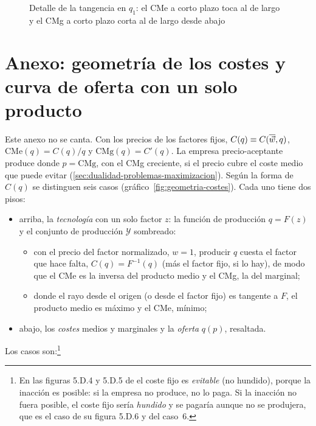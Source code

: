 \documentclass[11pt]{article}
\begin{document}
\begin{figure}[H]
\centering
\caption{Detalle de la tangencia en $q_1$: el CMe a corto plazo toca al de largo y el CMg a corto plazo corta al de largo desde abajo}\label{fig:tangencia-corto-largo}
\end{figure}

\section{Anexo: geometría de los costes\cortetitulo{} y curva de oferta con un solo producto}\label{anexo:geometria}

Este anexo no se canta. Con los precios de los factores fijos, $C(q)\equiv C(\overline{\vec{w}},q)$, $\mathrm{CMe}(q)=C(q)/q$ y $\mathrm{CMg}(q)=C'(q)$. La empresa precio-aceptante produce donde $p=\mathrm{CMg}$, con el CMg creciente, si el precio cubre el coste medio que puede evitar (\ref{sec:dualidad-problemas-maximizacion}). Según la forma de $C(q)$\nocite{MasColellWhinstonGreen1995} se distinguen seis casos (gráfico~\ref{fig:geometria-costes}). Cada uno tiene dos pisos:
\begin{itemize}
\item arriba, la \emph{tecnología} con un solo factor $z$: la función de producción $q=F(z)$ y el conjunto de producción $\mathcal{Y}$ sombreado:
  \begin{itemize}
  \item con el precio del factor normalizado, $w=1$, producir $q$ cuesta el factor que hace falta, $C(q)=F^{-1}(q)$ (más el factor fijo, si lo hay), de modo que el CMe es la inversa del producto medio y el CMg, la del marginal;
  \item donde el rayo desde el origen (o desde el factor fijo) es tangente a $F$, el producto medio es máximo y el CMe, mínimo;
  \end{itemize}
\item abajo, los \emph{costes} medios y marginales y la \emph{oferta} $q(p)$, resaltada.
\end{itemize}
Los casos son:\footnote{En las figuras 5.D.4 y 5.D.5 de \textcite{MasColellWhinstonGreen1995} el coste fijo es \emph{evitable} (no hundido), porque la inacción es posible: si la empresa no produce, no lo paga. Si la inacción no fuera posible, el coste fijo sería \emph{hundido} y se pagaría aunque no se produjera, que es el caso de su figura 5.D.6 y del caso~6.}
\end{document}
